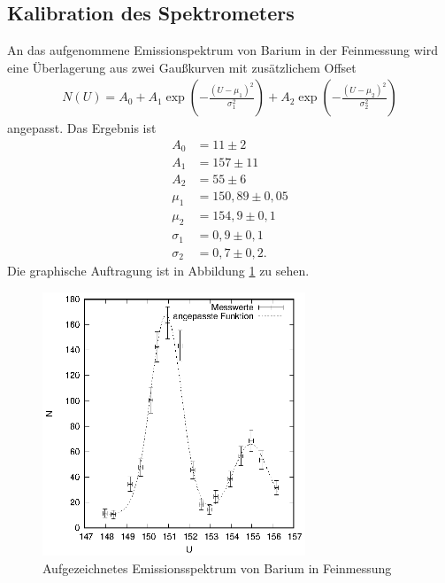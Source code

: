 \subsection{Kalibration des Spektrometers}
An das aufgenommene Emissionspektrum von Barium in der Feinmessung wird eine Überlagerung aus zwei Gaußkurven mit zusätzlichem Offset
\begin{align}
  N(U)=A_0+A_1\exp \left(-\frac{(U-\mu_1)^2}{\sigma_1^2}\right) +A_2\exp\left(-\frac{(U-\mu_2)^2}{\sigma_2^2} \right)
\label{eq:gauss}
\end{align}
angepasst. Das Ergebnis ist
\begin{align*}
  A_0&=11\pm 2\\
  A_1&=157\pm 11\\
  A_2&=55\pm 6\\
  \mu_1&=150,89 \pm 0,05\\
  \mu_2&=154,9 \pm 0,1\\
  \sigma_1&=0,9 \pm 0,1\\
  \sigma_2&=0,7 \pm 0,2.
\end{align*}
Die graphische Auftragung ist in Abbildung \ref{fig:ba_fein} zu sehen.
\begin{figure}[h]
  \centering
  \includegraphics[width=0.7\textwidth]{data/Ba_fein.eps}
  \caption{Aufgezeichnetes Emissionsspektrum von Barium in Feinmessung}
  \label{fig:ba_fein}
\end{figure}

